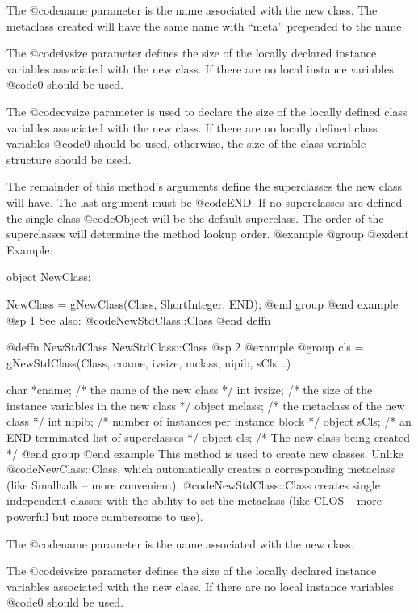 The @code{name} parameter is the name associated with the new class.
The metaclass created will have the same name with ``meta'' prepended
to the name.  

The @code{ivsize} parameter defines the size of the locally
declared instance variables associated with the new class.  If there are
no local instance variables @code{0} should be used.  

The @code{cvsize} parameter is used to declare the size of the locally
defined class variables associated with the new class.  If there are no
locally defined class variables @code{0} should be used, otherwise, the
size of the class variable structure should be used.

The remainder of this method's arguments define the superclasses the new
class will have.  The last argument must be @code{END}.  If no superclasses
are defined the single class @code{Object} will be the default
superclass.  The order of the superclasses will determine the method
lookup order.
@example
@group
@exdent Example:

object  NewClass;

NewClass = gNewClass(Class, ShortInteger, END);
@end group
@end example
@sp 1
See also:  @code{NewStdClass::Class}
@end deffn





@deffn {NewStdClass} NewStdClass::Class
@sp 2
@example
@group
cls = gNewStdClass(Class, cname, ivsize, mclass, nipib,
                   sCls...)

char    *cname; /*  the name of the new class    */
int     ivsize; /*  the size of the instance variables in 
                    the new class  */
object  mclass; /*  the metaclass of the new class  */
int     nipib;  /*  number of instances per instance block  */
object  sCls;   /*  an END terminated list of 
                           superclasses  */
object  cls;    /*  The new class being created  */
@end group
@end example
This method is used to create new classes.  Unlike @code{NewClass::Class},
which automatically creates a corresponding metaclass (like Smalltalk
-- more convenient), @code{NewStdClass::Class} creates single independent
classes with the ability to set the metaclass (like CLOS -- more
powerful but more cumbersome to use).

The @code{name} parameter is the name associated with the new class.

The @code{ivsize} parameter defines the size of the locally
declared instance variables associated with the new class.  If there are
no local instance variables @code{0} should be used.  

